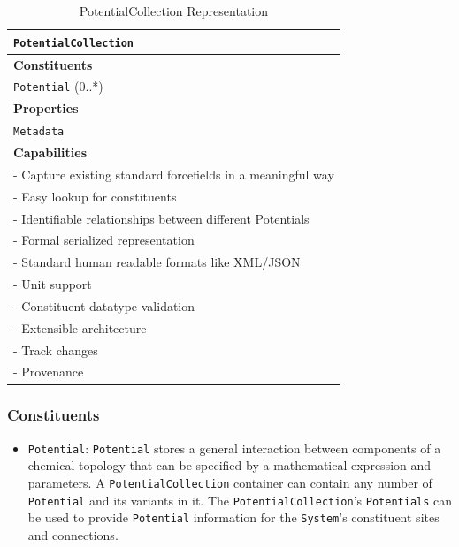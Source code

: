 \documentclass[12pt]{article}
\begin{document}
\begin{table}[ht]
    \centering
     \caption{PotentialCollection Representation}
    \begin{tabular}{|l|}
         \hline
         \rowcolor{gray!50}
         \texttt{PotentialCollection}  \\
         \hline
         \textbf{Constituents} \\
         \texttt{Potential} (0..*)\\
         \hline
         \textbf{Properties}\\
         \texttt{Metadata} \\
         \hline
         \textbf{Capabilities}\\
         \hline
         - Capture existing standard forcefields in a meaningful way\\
         - Easy lookup for constituents\\
         - Identifiable relationships between different Potentials\\
         - Formal serialized representation \\
         - Standard human readable formats like XML/JSON \\
         - Unit support\\
         - Constituent datatype validation\\
         - Extensible architecture\\
         - Track changes\\
         - Provenance \\
        \hline
    \end{tabular}
    \label{tab:ForceFieldSpec}
\end{table}

\subsubsection{Constituents}
\begin{itemize}
    \item \texttt{Potential}: \texttt{Potential} stores a general interaction between components of a chemical topology that can be specified by a mathematical expression and parameters. A \texttt{PotentialCollection} container can contain any number of \texttt{Potential} and its variants in it. The \texttt{PotentialCollection}'s \texttt{Potentials} can be used to provide \texttt{Potential} information for the \texttt{System}'s constituent sites and connections.
\end{itemize}
\end{document}
